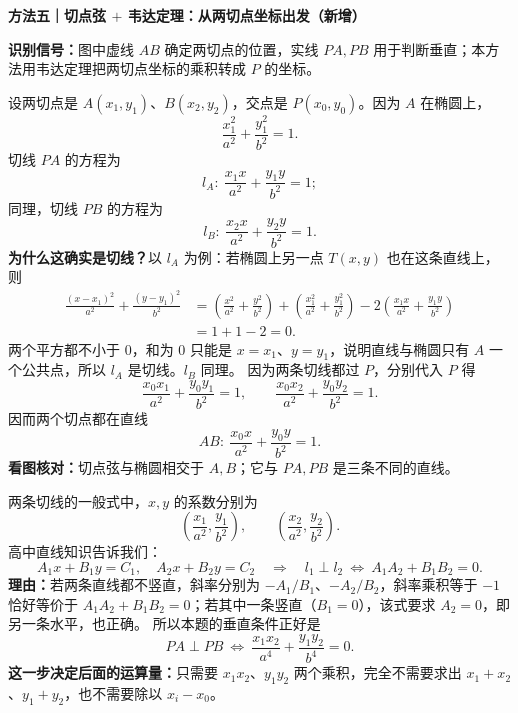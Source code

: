 \begin{proofbox}
  \medskip
  \begin{minipage}{\linewidth}
  \textbf{\textcolor{CProof}{方法五｜切点弦 $+$ 韦达定理：从两切点坐标出发（新增）}}
  
  \end{minipage}\par\medskip
  \textbf{识别信号：}图中虚线 $AB$ 确定两切点的位置，实线 $PA,PB$ 用于判断垂直；本方法用韦达定理把两切点坐标的乘积转成 $P$ 的坐标。
  \begin{description}[style=nextline, leftmargin=2.8em, labelsep=0.5em, itemsep=0.53em]
    \item[\textbf{第 1 步（写两条切线和切点弦）：}]
      设两切点是 $A(x_1,y_1)$、$B(x_2,y_2)$，交点是 $P(x_0,y_0)$。因为 $A$ 在椭圆上，
      \[
        \frac{x_1^2}{a^2}+\frac{y_1^2}{b^2}=1.
      \]
      切线 $PA$ 的方程为
      \[
        l_A:\ \frac{x_1x}{a^2}+\frac{y_1y}{b^2}=1;
      \]
      同理，切线 $PB$ 的方程为
      \[
        l_B:\ \frac{x_2x}{a^2}+\frac{y_2y}{b^2}=1.
      \]
      \textbf{为什么这确实是切线？}以 $l_A$ 为例：若椭圆上另一点 $T(x,y)$ 也在这条直线上，则
      \[
      \begin{aligned}
        \frac{(x-x_1)^2}{a^2}+\frac{(y-y_1)^2}{b^2}
        &=\left(\frac{x^2}{a^2}+\frac{y^2}{b^2}\right)
         +\left(\frac{x_1^2}{a^2}+\frac{y_1^2}{b^2}\right)
         -2\left(\frac{x_1x}{a^2}+\frac{y_1y}{b^2}\right)\\
        &=1+1-2=0.
      \end{aligned}
      \]
      两个平方都不小于 $0$，和为 $0$ 只能是 $x=x_1$、$y=y_1$，说明直线与椭圆只有 $A$ 一个公共点，所以 $l_A$ 是切线。$l_B$ 同理。
      因为两条切线都过 $P$，分别代入 $P$ 得
      \[
        \frac{x_0x_1}{a^2}+\frac{y_0y_1}{b^2}=1,\qquad
        \frac{x_0x_2}{a^2}+\frac{y_0y_2}{b^2}=1.
      \]
      因而两个切点都在直线
      \[
        \boxed{AB:\ \frac{x_0x}{a^2}+\frac{y_0y}{b^2}=1}.
      \]
      \textbf{看图核对：}切点弦与椭圆相交于 $A,B$；它与 $PA,PB$ 是三条不同的直线。

    \item[\textbf{第 2 步（先确定韦达定理真正需要的量）：}]
      两条切线的一般式中，$x,y$ 的系数分别为
      \[
        \left(\frac{x_1}{a^2},\frac{y_1}{b^2}\right),\qquad
        \left(\frac{x_2}{a^2},\frac{y_2}{b^2}\right).
      \]
      高中直线知识告诉我们：
      \[
        A_1x+B_1y=C_1,\quad A_2x+B_2y=C_2
        \quad\Longrightarrow\quad
        l_1\perp l_2\ \Longleftrightarrow\ A_1A_2+B_1B_2=0.
      \]
      \textbf{理由：}若两条直线都不竖直，斜率分别为 $-A_1/B_1$、$-A_2/B_2$，斜率乘积等于 $-1$ 恰好等价于 $A_1A_2+B_1B_2=0$；若其中一条竖直（$B_1=0$），该式要求 $A_2=0$，即另一条水平，也正确。
      所以本题的垂直条件正好是
      \[
        \boxed{PA\perp PB\ \Longleftrightarrow\
          \frac{x_1x_2}{a^4}+\frac{y_1y_2}{b^4}=0}.\tag{5-1}
      \]
      \textbf{这一步决定后面的运算量：}只需要 $x_1x_2$、$y_1y_2$ 两个乘积，完全不需要求出 $x_1+x_2$、$y_1+y_2$，也不需要除以 $x_i-x_0$。


\end{description}
\end{proofbox}

